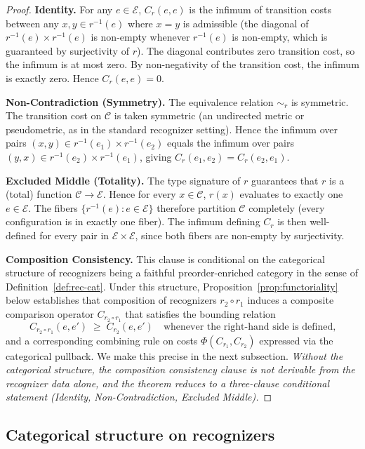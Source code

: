\documentclass[11pt,a4paper]{article}
\theoremstyle{definition}
\theoremstyle{remark}
\begin{document}
\begin{proof}
\textbf{Identity.} For any $e \in \mathcal{E}$, $C_r(e, e)$ is the
infimum of transition costs between any $x, y \in r^{-1}(e)$ where
$x = y$ is admissible (the diagonal of $r^{-1}(e) \times r^{-1}(e)$
is non-empty whenever $r^{-1}(e)$ is non-empty, which is guaranteed
by surjectivity of $r$). The diagonal contributes zero transition
cost, so the infimum is at most zero. By non-negativity of the
transition cost, the infimum is exactly zero. Hence $C_r(e, e) = 0$.

\textbf{Non-Contradiction (Symmetry).} The equivalence relation
$\sim_r$ is symmetric. The transition cost on $\mathcal{C}$ is taken
symmetric (an undirected metric or pseudometric, as in the standard
recognizer setting). Hence the infimum over pairs $(x, y) \in
r^{-1}(e_1) \times r^{-1}(e_2)$ equals the infimum over pairs $(y,
x) \in r^{-1}(e_2) \times r^{-1}(e_1)$, giving $C_r(e_1, e_2) =
C_r(e_2, e_1)$.

\textbf{Excluded Middle (Totality).} The type signature of $r$
guarantees that $r$ is a (total) function $\mathcal{C} \to
\mathcal{E}$. Hence for every $x \in \mathcal{C}$, $r(x)$ evaluates
to exactly one $e \in \mathcal{E}$. The fibers $\{r^{-1}(e) : e \in
\mathcal{E}\}$ therefore partition $\mathcal{C}$ completely (every
configuration is in exactly one fiber). The infimum defining $C_r$
is then well-defined for every pair in $\mathcal{E} \times
\mathcal{E}$, since both fibers are non-empty by surjectivity.

\textbf{Composition Consistency.} This clause is conditional on the
categorical structure of recognizers being a faithful preorder-enriched
category in the sense of
Definition~\ref{def:rec-cat}. Under this structure,
Proposition~\ref{prop:functoriality} below establishes that
composition of recognizers $r_2 \circ r_1$ induces a composite
comparison operator $C_{r_2 \circ r_1}$ that satisfies the bounding
relation
\[
C_{r_2 \circ r_1}(e, e') \;\ge\; C_{r_2}(e, e') \quad \text{whenever
the right-hand side is defined,}
\]
and a corresponding combining rule on costs $\Phi(C_{r_1}, C_{r_2})$
expressed via the categorical pullback. We make this precise in the
next subsection. \emph{Without the categorical structure, the
composition consistency clause is not derivable from the recognizer
data alone, and the theorem reduces to a three-clause conditional
statement (Identity, Non-Contradiction, Excluded Middle).}
\end{proof}

\subsection{Categorical structure on recognizers}
\label{subsec:rec-cat}
\end{document}
